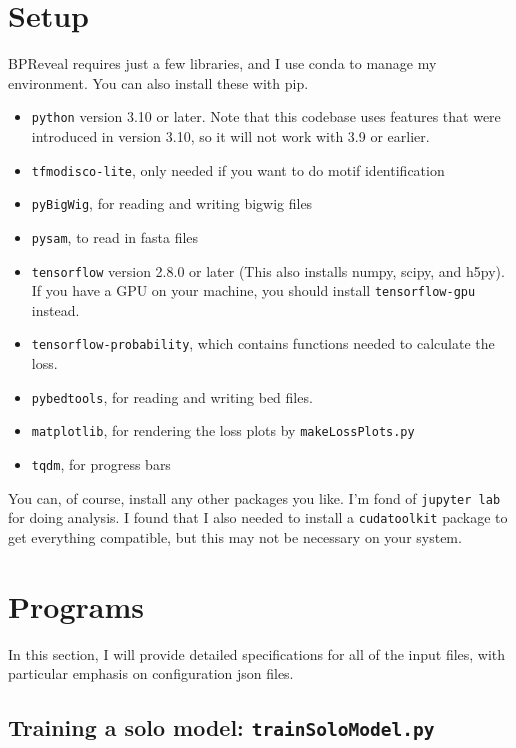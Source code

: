 \documentclass{article}
\begin{document}
\newpage

\section{Setup}

BPReveal requires just a few libraries, and I use conda to manage my environment. You can also install these with pip. 

\begin{itemize}
    \item \texttt{python} version 3.10 or later. Note that this codebase uses features that were introduced in version 3.10, so it will not work with 3.9 or earlier. 
    \item \texttt{tfmodisco-lite}, only needed if you want to do motif identification
    \item \texttt{pyBigWig}, for reading and writing bigwig files
    \item \texttt{pysam}, to read in fasta files
    \item \texttt{tensorflow} version 2.8.0 or later (This also installs numpy, scipy, and h5py). If you have a GPU on your machine, you should install \texttt{tensorflow-gpu} instead.
    \item \texttt{tensorflow-probability}, which contains functions needed to calculate the loss.
    \item \texttt{pybedtools}, for reading and writing bed files.
    \item \texttt{matplotlib}, for rendering the loss plots by \texttt{makeLossPlots.py}
    \item \texttt{tqdm}, for progress bars
\end{itemize}

You can, of course, install any other packages you like. 
I'm fond of \texttt{jupyter lab} for doing analysis. 
I found that I also needed to install a \texttt{cudatoolkit} package to get everything compatible, but this may not be necessary on your system. 


\newpage

\section{Programs}

In this section, I will provide detailed specifications for all of the input files, with particular emphasis on configuration json files.


\subsection{Training a solo model: \texttt{trainSoloModel.py}}
\end{document}
